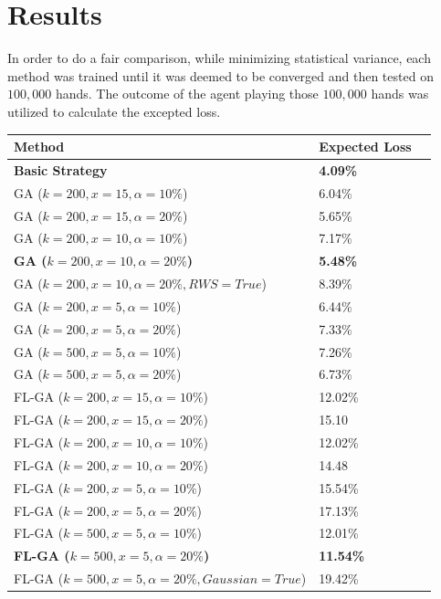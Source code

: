 \documentclass[10pt, a4paper, twocolumn]{article}
\begin{document}
\section{Results}

In order to do a fair comparison, while minimizing statistical variance, each method was trained until it was deemed to be converged and then tested on $100,000$ hands. The outcome of the agent playing those $100,000$ hands was utilized to calculate the excepted loss.

\begin{table}[H]
	\centering
	\begin{tabular}{llr}
		\toprule
		Method & Expected Loss \\
		\midrule
		\textbf{Basic Strategy} & \textbf{4.09\%} \\
		\midrule

		GA ($k = 200, x = 15, \alpha=10\%$) & 6.04\% \\
		GA ($k = 200, x = 15, \alpha=20\%$) & 5.65\% \\
		GA ($k = 200, x = 10, \alpha=10\%$) & 7.17\% \\
		\textbf{GA ($k = 200, x = 10, \alpha=20\%$)} & \textbf{5.48\%}  \\
		GA ($k = 200, x = 10, \alpha=20\% , RWS=True$) & 8.39\%  \\
		GA ($k = 200, x = 5, \alpha=10\%$) & 6.44\%  \\
		GA ($k = 200, x = 5, \alpha=20\%$) & 7.33\% \\
		GA ($k = 500, x = 5, \alpha=10\%$) & 7.26\%  \\
		GA ($k = 500, x = 5, \alpha=20\%$) & 6.73\%  \\
		\midrule

		FL-GA ($k = 200, x = 15, \alpha=10\%$) & 12.02\% \\
		FL-GA ($k = 200, x = 15, \alpha=20\%$) & 15.10 \\
		FL-GA ($k = 200, x = 10, \alpha=10\%$) & 12.02\% \\
		FL-GA ($k = 200, x = 10, \alpha=20\%$) & 14.48  \\
		FL-GA ($k = 200, x = 5, \alpha=10\%$) & 15.54\%  \\
		FL-GA ($k = 200, x = 5, \alpha=20\%$) & 17.13\% \\
		FL-GA ($k = 500, x = 5, \alpha=10\%$) & 12.01\%  \\
		\textbf{FL-GA ($k = 500, x = 5, \alpha=20\%$)} & \textbf{11.54\%}  \\
		FL-GA ($k = 500, x = 5, \alpha=20\%, Gaussian=True$) & 19.42\%  \\
		\midrule


\end{tabular}
\end{table}
\end{document}
